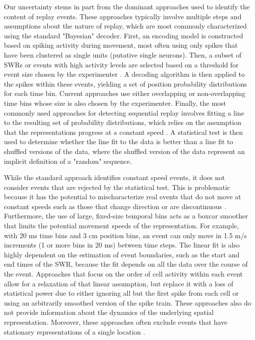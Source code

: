 \documentclass[9pt,lineno]{elife}
\begin{document}
Our uncertainty stems in part from the dominant approaches used to identify the content of replay events. These approaches typically involve multiple steps and assumptions about the nature of replay, which are most commonly characterized using the standard "Bayesian" decoder. First, an encoding model is constructed based on spiking activity during movement, most often using only spikes that have been clustered as single units (putative single neurons). Then, a subset of SWRs or events with high activity levels are selected based on a threshold for event size chosen by the experimenter \citep{FosterReversereplaybehavioural2006, DibaForwardreversehippocampal2007a, KarlssonAwakereplayremote2009, StellaHippocampalReactivationRandom2019}. A decoding algorithm is then applied to the spikes within these events, yielding a set of position probability distributions for each time bin. Current approaches use either overlapping or non-overlapping time bins whose size is also chosen by the experimenter. Finally, the most commonly used approaches for detecting sequential replay involves fitting a line to the resulting set of probability distributions, which relies on the assumption that the representations progress at a constant speed \citep{FosterReversereplaybehavioural2006, DibaForwardreversehippocampal2007a, KarlssonAwakereplayremote2009}. A statistical test is then used to determine whether the line fit to the data is better than a line fit to shuffled versions of the data, where the shuffled version of the data represent an implicit definition of a "random" sequence.

While the standard approach identifies constant speed events, it does not consider events that are rejected by the statistical test. This is problematic because it has the potential to mischaracterize real events that do not move at constant speeds such as those that change direction or are discontinuous \citep{LiuMethodsAssessmentMemory2018}. Furthermore, the use of large, fixed-size temporal bins acts as a boxcar smoother that limits the potential movement speeds of the representation. For example, with 20 ms time bins and 3 cm position bins, an event can only move in 1.5 m/s increments (1 or more bins in 20 ms) between time steps. The linear fit is also highly dependent on the estimation of event boundaries, such as the start and end times of the SWR, because the fit depends on all the data over the course of the event. Approaches that focus on the order of cell activity within each event \citep{LeeMemorySequentialExperience2002, GuptaHippocampalReplayNot2010} allow for a relaxation of that linear assumption, but replace it with a loss of statistical power due to either ignoring all but the first spike from each cell or using an arbitrarily smoothed version of the spike train. These approaches also do not provide information about the dynamics of the underlying spatial representation. Moreover, these approaches often exclude events that have stationary representations of a single location \citep{YuDistincthippocampalcorticalmemory2017, FarooqEmergencepreconfiguredplastic2019}. 
\end{document}
